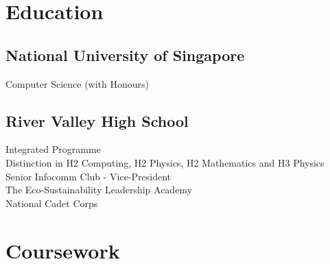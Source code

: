 \documentclass[a4paper,hidelinks]{resume} %
\begin{document}
\begin{minipage}[t]{0.45\textwidth} %

    
    \section{Education}
    
    \sectionspace %
    
    \subsection{National University of Singapore}
    
     {Computer Science (with Honours)} \\
    
    \sectionspace %
    
    \subsection{River Valley High School}
    
     {Integrated Programme} \\
    Distinction in H2 Computing, H2 Physics, H2 Mathematics and H3 Physics \\
    Senior Infocomm Club - Vice-President \\
    The Eco-Sustainability Leadership Academy  \\
    National Cadet Corps \\
    
    \sectionspace %
    
    
    \section{Coursework}
    
    \sectionspace %
    

\end{minipage}
\end{document}
